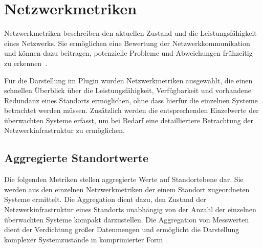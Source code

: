 \section{Netzwerkmetriken}
\label{sec:netzwerkmetriken}

Netzwerkmetriken beschreiben den aktuellen Zustand und die Leistungsfähigkeit
eines Netzwerks. Sie ermöglichen eine Bewertung der Netzwerkkommunikation
und können dazu beitragen, potenzielle Probleme und Abweichungen frühzeitig
zu erkennen~\cite{aruba2026userguide}.

Für die Darstellung im Plugin wurden Netzwerkmetriken ausgewählt, die einen
schnellen Überblick über die Leistungsfähigkeit, Verfügbarkeit und
vorhandene Redundanz eines Standorts ermöglichen, ohne dass hierfür die
einzelnen Systeme betrachtet werden müssen. Zusätzlich werden die
entsprechenden Einzelwerte der überwachten Systeme erfasst, um bei Bedarf
eine detailliertere Betrachtung der Netzwerkinfrastruktur zu ermöglichen.

\subsection{Aggregierte Standortwerte}
\label{subsec:netzwerk-aggregierte-werte}

Die folgenden Metriken stellen aggregierte Werte auf Standortebene dar.
Sie werden aus den einzelnen Netzwerkmetriken der einem Standort
zugeordneten Systeme ermittelt. Die Aggregation dient dazu, den Zustand
der Netzwerkinfrastruktur eines Standorts unabhängig von der Anzahl der
einzelnen überwachten Systeme kompakt darzustellen. Die Aggregation von 
Messwerten dient der Verdichtung großer Datenmengen und ermöglicht die 
Darstellung komplexer Systemzustände in komprimierter Form \cite{wen2020aggregation}.

